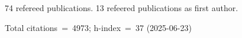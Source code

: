 74 refereed publications. 13 refeered publications as first author.

Total citations~=~4973; h-index~=~37 (2025-06-23)
